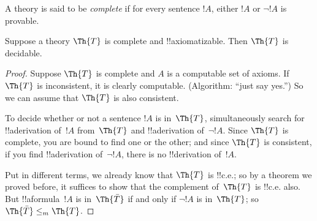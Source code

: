 \documentclass[../../../include/open-logic-section]{subfiles}
\begin{document}

A theory is said to be {\em complete} if for every sentence $!A$,
either $!A$ or $\lnot !A$ is provable.

\begin{lem}
Suppose a theory $\Th{T}$ is complete and !!{axiomatizable}. Then
$\Th{T}$ is decidable.
\end{lem}

\begin{proof}
Suppose $\Th{T}$ is complete and $A$ is a computable set of axioms.
If $\Th{T}$ is inconsistent, it is clearly computable. (Algorithm: ``just
say yes.'') So we can assume that $\Th{T}$ is also consistent.

To decide whether or not a sentence $!A$ is in~$\Th{T}$,
simultaneously search for !!a{derivation} of~$!A$ from~$\Th{T}$ and
!!a{derivation} of~$\lnot !A$. Since $\Th{T}$ is complete, you are
bound to find one or the other; and since $\Th{T}$ is consistent, if you
find !!a{derivation} of~$\lnot !A$, there is no !!{derivation} of~$!A$.

Put in different terms, we already know that $\Th{T}$ is !!{c.e.}; so
by a theorem we proved before, it suffices to show that the complement
of~$\Th{T}$ is !!{c.e.} also. But !!a{formula}~$!A$ is in~$\Th{\bar
T}$ if and only if $\lnot !A$ is in~$\Th{T}$; so $\Th{\bar T} \leq_m
\Th{T}$.
\end{proof}
\end{document}
